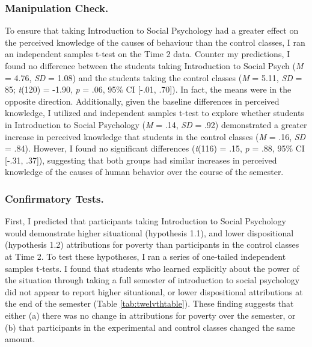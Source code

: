 \documentclass{sfuthesis}
\begin{document}
\subsubsection{Manipulation Check.}

To ensure that taking Introduction to Social Psychology had a greater effect on the perceived knowledge of the causes of behaviour than the control classes, I ran an independent samples t-test on the Time 2 data. Counter my predictions, I found no difference between the students taking Introduction to Social Psych (\textit{M} = 4.76, \textit{SD} = 1.08) and the students taking the control classes (\textit{M} = 5.11, \textit{SD} = 85; \textit{t}(120) = -1.90, \textit{p} = .06, 95\% CI [-.01, .70]). In fact, the means were in the opposite direction. Additionally, given the baseline differences in perceived knowledge, I utilized and independent samples t-test to explore whether students in Introduction to Social Psychology (\textit{M} = .14, \textit{SD} = .92) demonstrated a greater increase in perceived knowledge that students in the control classes (\textit{M} = .16, \textit{SD} = .84). However, I found no significant differences (\textit{t}(116) = .15, \textit{p} = .88, 95\% CI [-.31, .37]), suggesting that both groups had similar increases in perceived knowledge of the causes of human behavior over the course of the semester.

\subsubsection{Confirmatory Tests.}

First, I predicted that participants taking Introduction to Social Psychology would demonstrate higher situational (hypothesis 1.1), and lower dispositional (hypothesis 1.2) attributions for poverty than participants in the control classes at Time 2. To test these hypotheses, I ran a series of one-tailed independent samples t-tests. I found that students who learned explicitly about the power of the situation through taking a full semester of introduction to social psychology did not appear to report higher situational, or lower dispositional attributions at the end of the semester (Table \ref{tab:twelvthtable}). These finding suggests that either (a) there was no change in attributions for poverty over the semester, or (b) that participants in the experimental and control classes changed the same amount.
\end{document}
